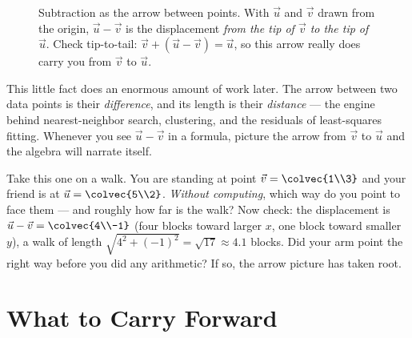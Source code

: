 \begin{figure}[H]
\centering
{}
\caption{Subtraction as the arrow between points. With $\vec{u}$ and $\vec{v}$ drawn from
the origin, $\vec{u}-\vec{v}$ is the displacement \emph{from the tip of $\vec{v}$ to the
tip of $\vec{u}$}. Check tip-to-tail: $\vec{v} + (\vec{u}-\vec{v}) = \vec{u}$, so this
arrow really does carry you from $\vec{v}$ to $\vec{u}$.}
\label{ch02:fig-subtract}
\end{figure}

This little fact does an enormous amount of work later. The arrow between two data points
is their \emph{difference}, and its length is their \emph{distance} --- the engine behind
nearest-neighbor search, clustering, and the residuals of least-squares fitting. Whenever
you see $\vec{u}-\vec{v}$ in a formula, picture the arrow from $\vec{v}$ to $\vec{u}$ and
the algebra will narrate itself.

\begin{walkbox}
Take this one on a walk. You are standing at point $\vec{v}=\colvec{1\\3}$ and your friend
is at $\vec{u}=\colvec{5\\2}$. \emph{Without computing}, which way do you point to face
them --- and roughly how far is the walk? Now check: the displacement is
$\vec{u}-\vec{v}=\colvec{4\\-1}$ (four blocks toward larger $x$, one block toward smaller
$y$), a walk of length $\sqrt{4^2+(-1)^2}=\sqrt{17}\approx 4.1$ blocks. Did your arm point
the right way before you did any arithmetic? If so, the arrow picture has taken root.
\end{walkbox}

\section{What to Carry Forward}
\label{ch02:summary}

